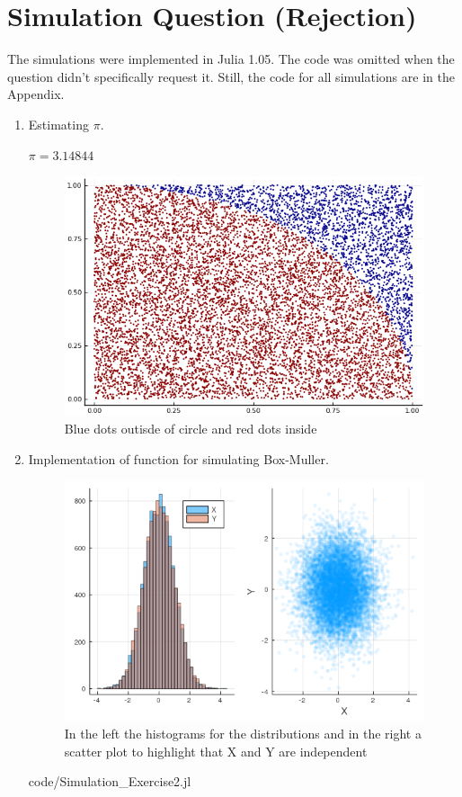 \documentclass[12pt,letterpaper]{article}
\begin{document}
\section*{Simulation Question (Rejection)}
	The simulations were implemented in Julia 1.05. The code
	was omitted when the question didn't specifically
	request it. Still,
	the code for all
	simulations are in the Appendix.
\begin{enumerate}[leftmargin=!,labelindent=5pt]
    \item Estimating $\pi$.

    $\pi = 3.14844$
        \begin{figure}[H]
            \centering
            \includegraphics[width=15cm]{images/Ex1.png}
            \caption{Blue dots outisde of circle and red dots inside}
            \label{fig:1}
        \end{figure}

\newpage
	\item Implementation of function for simulating Box-Muller.
        \begin{figure}[H]
            \centering
            \includegraphics[width=15cm]{images/Ex2.png}
            \caption{In the left the histograms for the distributions
            and in the right a scatter plot to highlight that X and
            Y are independent}
            \label{fig:2}
        \end{figure}
        
        {code/Simulation_Exercise2.jl}



\end{enumerate}
\end{document}
